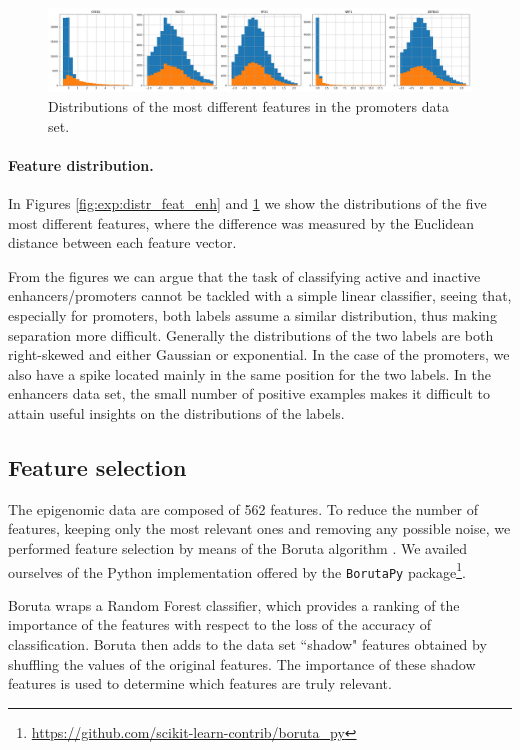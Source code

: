 \documentclass{article}
\begin{document}
\begin{figure}
    \centering
    \includegraphics[width=\textwidth]{img/top_different_features_promoters.png}
    \caption{Distributions of the most different features in the promoters data set.}
    \label{fig:exp:distr_feat_prom}
\end{figure}

\paragraph{Feature distribution.} In Figures \ref{fig:exp:distr_feat_enh} and \ref{fig:exp:distr_feat_prom} we show the distributions of the five most different features, where the difference was measured by the Euclidean distance between each feature vector.

From the figures we can argue that the task of classifying active and inactive enhancers/promoters cannot be tackled with a simple linear classifier, seeing that, especially for promoters, both labels assume a similar distribution, thus making separation more difficult. Generally the distributions of the two labels are both right-skewed and either Gaussian or exponential. In the case of the promoters, we also have a spike located mainly in the same position for the two labels. In the enhancers data set, the small number of positive examples makes it difficult to attain useful insights on the distributions of the labels.

\subsection{Feature selection}
\label{subsec:exp:feature_sel}

The epigenomic data are composed of 562 features. To reduce the number of features, keeping only the most relevant ones and removing any possible noise, we performed feature selection by means of the Boruta algorithm \cite{kursa10boruta}. We availed ourselves of the Python implementation offered by the \texttt{BorutaPy} package\footnote{\url{https://github.com/scikit-learn-contrib/boruta_py}}.

Boruta wraps a Random Forest classifier, which provides a ranking of the importance of the features with respect to the loss of the accuracy of classification. Boruta then adds to the data set  “shadow" features obtained by shuffling the values of the original features. The importance of these shadow features is used to determine which features are truly relevant.
\end{document}
